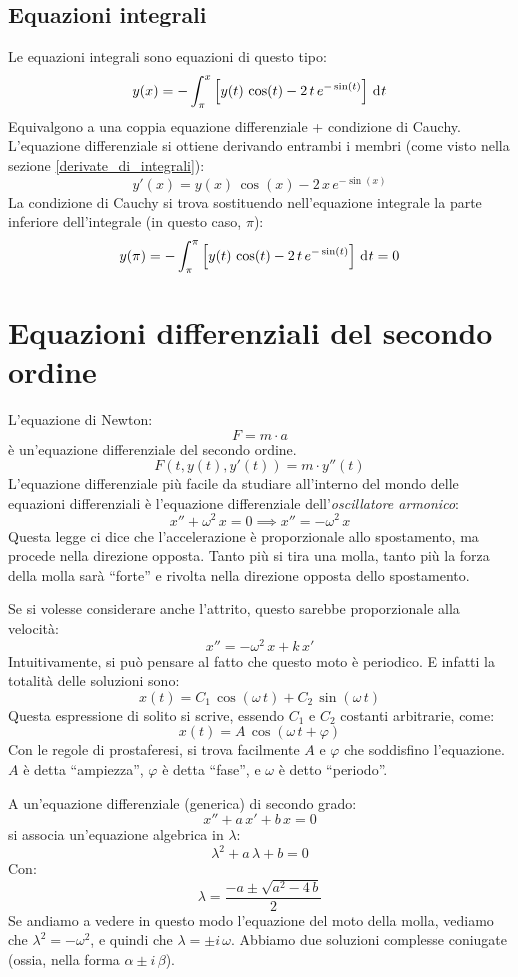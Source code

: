 \subsection{Equazioni integrali}

Le equazioni integrali sono equazioni di questo tipo:
\[
y(x) = - \int_{\pi}^{x} \left[ y(t) \, \cos(t) - 2 \, t \, e^{- \sin(t)} \right] \dx[t]
\]
Equivalgono a una coppia equazione differenziale + condizione di Cauchy. L'equazione differenziale si ottiene derivando entrambi i membri (come visto nella sezione \ref{derivate_di_integrali}):
\[
y'(x) = y(x) \, \cos(x) - 2 \, x \, e^{-\sin(x)}
\]
La condizione di Cauchy si trova sostituendo nell'equazione integrale la parte inferiore dell'integrale (in questo caso, $\pi$):
\[
y(\pi) = - \int_{\pi}^{\pi} \left[ y(t) \, \cos(t) - 2 \, t \, e^{- \sin(t)} \right] \dx[t] = 0
\]
\section{Equazioni differenziali del secondo ordine}

L'equazione di Newton:
\[
F = m \cdot a
\]
\`e un'equazione differenziale del secondo ordine.
\[
F(t, y(t), y'(t)) = m \cdot y''(t)
\]
L'equazione differenziale pi\`u facile da studiare all'interno del mondo delle equazioni differenziali \`e l'equazione differenziale dell'\emph{oscillatore armonico}:
\[
x'' + \omega^2 \, x = 0 \implies x'' = - \omega^2 \, x
\]
Questa legge ci dice che l'accelerazione \`e proporzionale allo spostamento, ma procede nella direzione opposta. Tanto pi\`u si  tira una molla, tanto pi\`u la forza della molla sar\`a ``forte'' e rivolta nella direzione opposta dello spostamento.

Se si volesse considerare anche l'attrito, questo sarebbe proporzionale alla velocit\`a:
\[
x'' = - \omega^2 \, x + k \, x'
\]
Intuitivamente, si pu\`o pensare al fatto che questo moto \`e periodico. E infatti la totalit\`a delle soluzioni sono:
\[
x(t) = C_1 \, \cos ( \omega \, t) + C_2 \, \sin ( \omega \, t )
\]
Questa espressione di solito si scrive, essendo $C_1$ e $C_2$ costanti arbitrarie, come:
\[
x(t) = A \, \cos (\omega \, t + \varphi )
\]
Con le regole di prostaferesi, si trova facilmente $A$ e $\varphi$ che soddisfino l'equazione. $A$ \`e detta ``ampiezza'', $\varphi$ \`e detta ``fase'', e $\omega$ \`e detto ``periodo''.

A un'equazione differenziale (generica) di secondo grado:
\[
x'' + a \, x' + b \, x = 0
\]
si associa un'equazione algebrica in $\lambda$:
\[
\lambda^2 + a \, \lambda + b = 0
\]
Con:
\[
\lambda = \frac{- a \pm \sqrt{a^2 - 4 \, b}}{2}
\]
Se andiamo a vedere in questo modo l'equazione del moto della molla, vediamo che $\lambda^2 = - \omega^2$, e quindi che $\lambda = \pm i \, \omega$. Abbiamo due soluzioni complesse coniugate (ossia, nella forma $\alpha \pm i \, \beta$).

